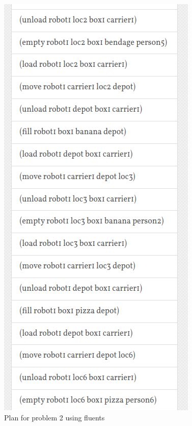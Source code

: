 \begin{figure}[htp]
    \includegraphics[scale = 0.66]{images/p2_fluents3.png}
    \caption{Plan for problem 2 using fluents}
    \label{problem2_plan_fluents}
\end{figure}

